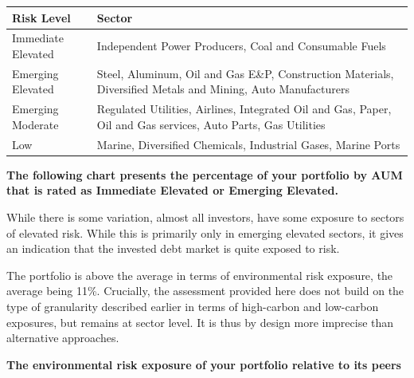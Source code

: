 \documentclass[10pt,table,a4]{article}\usepackage[]{graphicx}\usepackage[]{color}
\begin{document}
		
		\begin{center}
			{\setlength{\tabcolsep}{10pt} %
				\renewcommand{\arraystretch}{1.5} %
				\begin{tabular}{ p{.2\linewidth}| p{.7\linewidth} }
					\hline
					\textbf{Risk Level} & \textbf{Sector}  \\ 
					\hline
					\cellcolor{ColRed} Immediate Elevated & Independent Power Producers, Coal and Consumable Fuels \\ 
					\hline
					\cellcolor{ColOrange} Emerging Elevated & Steel, Aluminum, Oil and Gas E\&P, Construction Materials, Diversified Metals and Mining, Auto Manufacturers \\ 
					\hline
					\cellcolor{ColYellow} Emerging Moderate & Regulated Utilities, Airlines, Integrated Oil and Gas, Paper, Oil and Gas services, Auto Parts, Gas Utilities \\ 
					\hline
					\cellcolor{ColGreen} Low & Marine, Diversified Chemicals, Industrial Gases, Marine Ports  \\ 
					\hline
				\end{tabular}
			}
		\end{center}
		
		\begin{multicols}{2}
			\textbf{The following chart presents the percentage of your portfolio by AUM that is rated as Immediate Elevated or Emerging Elevated.} 
			
			While there is some variation, almost all investors, have some exposure to sectors of elevated risk. While this is primarily only in emerging elevated 	sectors, it gives an indication that the invested debt market is quite exposed to risk. 
			
			The portfolio is above the average in terms of environmental risk exposure, the average being 11\%. Crucially, the assessment provided here does not build on the 	type of granularity described earlier in terms of high-carbon and low-carbon exposures, but remains at sector level. It is thus by design more imprecise than alternative approaches.
		\end{multicols}	
		
		
		\textbf{The environmental risk exposure of your portfolio relative to its peers}
		
		\begin{centering}
					
		\end{centering}
		
\end{document}
